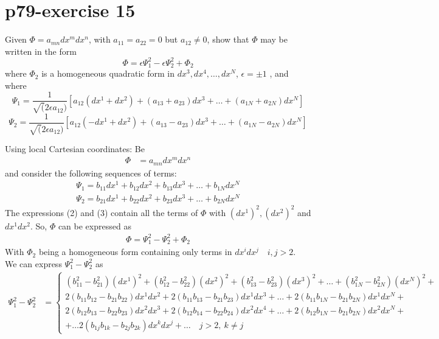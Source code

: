 \section{p79-exercise 15}
\begin{tcolorbox}
Given $\Phi = a_{mn}dx^m dx^n$, with $a_{11} = a_{22}= 0$ but $a_{12} \ne 0$, show that $\Phi$ may be written in the form $$ \Phi = \epsilon\Psi^2_1- \epsilon\Psi^2_2 + \Phi_2$$ where $\Phi_2$ is a homogeneous quadratic form in $ dx^3, dx^4, \dots ,dx^N $, $\epsilon = \pm 1$ , and where 
$$\Psi_1 = \frac{1}{\sqrt(2 \epsilon a_{12})}\left[ a_{12}(dx^1+dx^2) + (a_{13}+a_{23})dx^3+ \dots +(a_{1N}+a_{2N})dx^N \right]$$
$$\Psi_2 = \frac{1}{\sqrt(2 \epsilon a_{12})}\left[ a_{12}(-dx^1+dx^2) + (a_{13}-a_{23})dx^3+ \dots +(a_{1N}-a_{2N})dx^N \right]$$
\end{tcolorbox}
Using local Cartesian coordinates:
Be 
\begin{align}
\Phi &= a_{mn}dx^mdx^n
\end{align}
and consider the following sequences of terms: 
\begin{align}
\Psi_1 =  b_{11}dx^1+b_{12}dx^2 + b_{13}dx^3+ \dots +b_{1N}dx^N \\
\Psi_2 =  b_{21}dx^1+b_{22}dx^2 + b_{23}dx^3+ \dots +b_{2N}dx^N 
\end{align}
The expressions (2) and (3) contain all the terms of $\Phi$ with $(dx^1)^2,(dx^2)^2$ and $dx^1dx^2$. So, $\Phi$ can be expressed as 
\begin{align}
\Phi =\Psi_1^2 -\Psi_2^2 + \Phi_2 
\end{align}
With $\Phi_2 $ being a homogeneous form containing only terms in $dx^i dx^j \quad i,j > 2$.\\
We can express $\Psi_1^2 - \Psi_2^2$ as
\begin{align}
\Psi_1^2 - \Psi_2^2 &= \left \{ \begin{array}{l}(b_{11}^2 - b_{21}^2)(dx^1)^2 +(b_{12}^2 - b_{22}^2)(dx^2)^2 +(b_{13}^2 - b_{23}^2)(dx^3 )^2 + \dots +(b_{1N}^2 - b_{2N}^2)(dx^N)^2 +\\
 2( b_{11} b_{12}-b_{21} b_{22})dx^1dx^2+2( b_{11} b_{13}-b_{21} b_{23})dx^1dx^3+\dots + 2( b_{11} b_{1N}-b_{21} b_{2N})dx^1dx^N+\\
 2( b_{12} b_{13}-b_{22} b_{23})dx^2dx^3+2( b_{12} b_{14}-b_{22} b_{24})dx^2dx^4+\dots + 2( b_{12} b_{1N}-b_{21} b_{2N})dx^2dx^N+\\
 + \dots 2( b_{1j} b_{1k}-b_{2j} b_{2k})dx^kdx^j+\dots\quad j>2, \ k\ne j
\end{array} \right.
\end{align}
